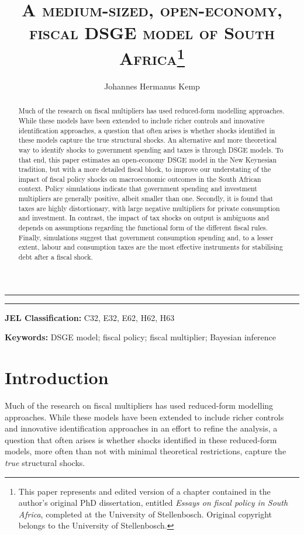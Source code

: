 \documentclass[a4paper,11pt]{article}
\title{\textsc{A medium-sized, open-economy, fiscal DSGE model of South Africa}\footnote{This paper represents and edited version of a chapter contained in the author's original PhD dissertation, entitled \textit{Essays on fiscal policy in South Africa}, completed at the University of Stellenbosch. Original copyright belongs to the University of Stellenbosch.}}
\author{Johannes Hermanus Kemp}
\numberwithin{equation}{section}
\begin{document}
	

\maketitle
	\thispagestyle{empty}
	\noindent\rule{16.5cm}{0.4pt}
	
	\begin{abstract}
		  \noindent Much of the research on fiscal multipliers has used reduced-form modelling approaches. While these models have been extended to include richer controls and innovative identification approaches, a question that often arises is whether shocks identified in these models capture the true structural shocks. An alternative and more theoretical way to identify shocks to government spending and taxes is through DSGE models. To that end, this paper estimates an open-economy DSGE model in the New Keynesian tradition, but with a more detailed fiscal block, to improve our understating of the impact of fiscal policy shocks on macroeconomic outcomes in the South African context. Policy simulations indicate that government spending and investment multipliers are generally positive, albeit smaller than one. Secondly, it is found that taxes are highly distortionary, with large negative multipliers for private consumption and investment. In contrast, the impact of tax shocks on output is ambiguous and depends on assumptions regarding the functional form of the different fiscal rules. Finally, simulations suggest that government consumption spending and, to a lesser extent, labour and consumption taxes are the most effective instruments for stabilising debt after a fiscal shock. 
	\end{abstract}
	
	\noindent\rule{16.5cm}{0.4pt}
	
	

\textbf{JEL Classification:} C32, E32, E62, H62, H63
	
\textbf{Keywords:} DSGE model; fiscal policy; fiscal multiplier; Bayesian inference 
	
\newpage
{}


\section{Introduction}
	
	Much of the research on fiscal multipliers has used reduced-form modelling approaches. While these models have been extended to include richer controls and innovative identification approaches in an effort to refine the analysis, a question that often arises is whether shocks identified in these reduced-form models, more often than not with minimal theoretical restrictions, capture the \textit{true} structural shocks. 
	
\end{document}
